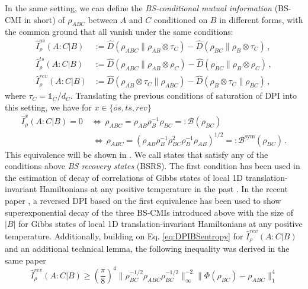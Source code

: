 \documentclass[11pt]{article}
\theoremstyle{newdefinition}
\theoremstyle{newplain}
\theoremstyle{myplain}
\DeclareMathOperator{\1}{\mathds{1}}
\begin{document}
In the same setting, we can define the \textit{BS-conditional mutual information} (BS-CMI in short) of $\rho_{ABC}$ between $A$ and $C$ conditioned on $B$ in different forms, with the common ground that all vanish under the same conditions:
\begin{align}
    \widehat{I}^{os}_{\rho}(A:C | B) & := \widehat{D}(\rho_{ABC} \|  \rho_{AB} \otimes \tau_C  ) -\widehat{D}(\rho_{BC} \| \rho_{B} \otimes \tau_C   )  \, , \\
    \widehat{I}^{ts}_{\rho}(A:C | B) & := \widehat{D}(\rho_{ABC} \| \rho_{AB} \otimes \rho_C   ) -\widehat{D}(\rho_{BC} \| \rho_{B} \otimes \rho_C   )  \, , \\
    \widehat{I}^{rev}_{\rho}(A:C | B) & := \widehat{D}(\rho_{AB} \otimes \tau_C   \| \rho_{ABC}  ) -\widehat{D}(\rho_{B} \otimes \tau_C  \| \rho_{BC}  )  \, , 
\end{align}
where $\tau_C = \mathds{1}_C / d_C$. Translating the previous conditions of saturation of DPI into this setting, we have for $x\in \{ os, ts, rev\}$
\begin{align}\label{eq:BSCMIZero}
   \widehat{I}^x_{\rho}(A:C | B) = 0 \, & \Leftrightarrow \, \rho_{ABC} = \rho_{AB} \rho_B^{-1} \rho_{BC} =:  \mathcal{B}(\rho_{BC}) \\
   & \, \Leftrightarrow \, \rho_{ABC} = ( \rho_{AB} \rho_B^{-1} \rho_{BC}^2 \rho_B^{-1} \rho_{AB} )^{1/2}  =:  \mathcal{B}^{\text{sym}}(\rho_{BC}) \, .
\end{align}
This equivalence will be shown in . We call states that satisfy any of the conditions above \textit{BS recovery states} (BSRS). The first condition has been used in the estimation of decay of correlations of Gibbs states of local 1D translation-invariant Hamiltonians at any positive temperature in the past \cite{BluhmCapelPerezHernandez-ExpDecayMI-2021}. In the recent paper \cite{gondolf2024conditional}, a reversed DPI based on the first equivalence has been used to show superexponential decay of the three BS-CMIs introduced above with the size of $|B|$ for Gibbs states of local 1D translation-invariant Hamiltonians at any positive temperature. Additionally, building on Eq. \eqref{eq:DPIBSentropy} for $\widehat{I}^{rev}_{\rho}(A:C | B)$ and an additional technical lemma, the following inequality was derived in the same paper
\begin{equation}\label{ineq:LowerBoundReversedCMI}
   \widehat{I}^{rev}_{\rho}(A:C | B) \geq  \left( \frac{\pi}{8} \right)^4 \|\rho_{BC}^{-1/2}\rho_{ABC}\rho_{BC}^{-1/2} \|_\infty^{-2}\|\Phi(\rho_{BC})-\rho_{ABC}\|_1^4 
\end{equation}
\end{document}
